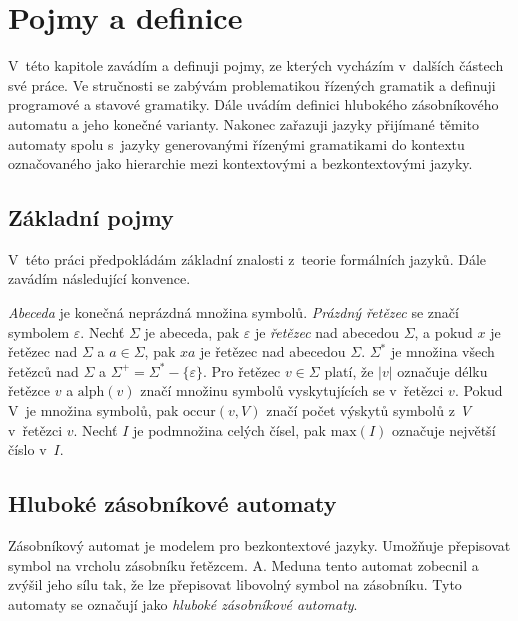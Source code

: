 \chapter{Pojmy a definice}

V~této kapitole zavádím a definuji pojmy, ze kterých vycházím v~dalších částech své práce. Ve stručnosti se zabývám problematikou řízených gramatik a definuji programové a stavové gramatiky. Dále uvádím definici hlubokého zásobníkového automatu a jeho konečné varianty. Nakonec zařazuji jazyky přijímané těmito automaty spolu s~jazyky generovanými řízenými gramatikami do kontextu označovaného jako hierarchie mezi kontextovými a bezkontextovými jazyky.

\section{Základní pojmy}

V~této práci předpokládám základní znalosti z~teorie formálních jazyků. Dále zavádím následující konvence.

\emph{Abeceda} je konečná neprázdná množina symbolů. 
\emph{Prázdný řetězec} se značí symbolem $\varepsilon$. 
Nechť $\Sigma$ je abeceda, pak $\varepsilon$ je \emph{řetězec} nad abecedou $\Sigma$, a pokud $x$ je řetězec nad $\Sigma$ a $a \in \Sigma$, pak $xa$ je řetězec nad abecedou $\Sigma$.  
$\Sigma^*$ je množina všech řetězců nad $\Sigma$ a $\Sigma^+ = \Sigma^* - \{\varepsilon\}$. 
Pro řetězec $v \in \Sigma$ platí, že $|v|$ označuje délku řetězce $v$ a $\mathrm{alph}(v)$ značí množinu symbolů vyskytujících se v~řetězci $v$. Pokud V~je množina symbolů, pak $\mathrm{occur}(v, V)$ značí počet výskytů symbolů z~$V$ v~řetězci $v$. 
Nechť $I$ je podmnožina celých čísel, pak $\mathrm{max}(I)$ označuje největší číslo v~$I$.

\section{Hluboké zásobníkové automaty}

Zásobníkový automat je modelem pro bezkontextové jazyky. Umožňuje přepisovat symbol na vrcholu zásobníku řetězcem. A. Meduna tento automat zobecnil a zvýšil jeho sílu tak, že lze přepisovat libovolný symbol na zásobníku. Tyto automaty se označují jako \emph{hluboké zásobníkové automaty}. 

